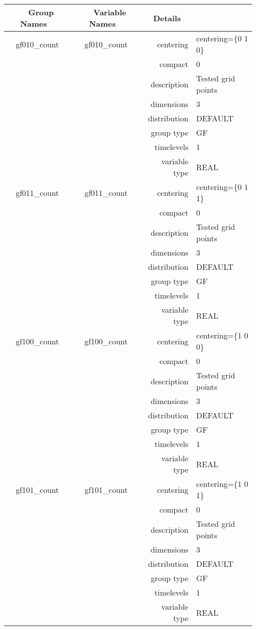 \begin{tabular*}{150mm}{|c|c@{\extracolsep{\fill}}|rl|} \hline 
~ {\bf Group Names} ~ & ~ {\bf Variable Names} ~  &{\bf Details} ~ & ~ \\ 
\hline 
gf010\_count & gf010\_count & centering & centering=\{0 1 0\} \\ 
 &  & compact & 0 \\ 
 &  & description & Tested grid points \\ 
 &  & dimensions & 3 \\ 
 &  & distribution & DEFAULT \\ 
 &  & group type & GF \\ 
 &  & timelevels & 1 \\ 
 &  & variable type & REAL \\ 
\hline 
gf011\_count & gf011\_count & centering & centering=\{0 1 1\} \\ 
 &  & compact & 0 \\ 
 &  & description & Tested grid points \\ 
 &  & dimensions & 3 \\ 
 &  & distribution & DEFAULT \\ 
 &  & group type & GF \\ 
 &  & timelevels & 1 \\ 
 &  & variable type & REAL \\ 
\hline 
gf100\_count & gf100\_count & centering & centering=\{1 0 0\} \\ 
 &  & compact & 0 \\ 
 &  & description & Tested grid points \\ 
 &  & dimensions & 3 \\ 
 &  & distribution & DEFAULT \\ 
 &  & group type & GF \\ 
 &  & timelevels & 1 \\ 
 &  & variable type & REAL \\ 
\hline 
gf101\_count & gf101\_count & centering & centering=\{1 0 1\} \\ 
 &  & compact & 0 \\ 
 &  & description & Tested grid points \\ 
 &  & dimensions & 3 \\ 
 &  & distribution & DEFAULT \\ 
 &  & group type & GF \\ 
 &  & timelevels & 1 \\ 
 &  & variable type & REAL \\ 

\end{tabular*}
